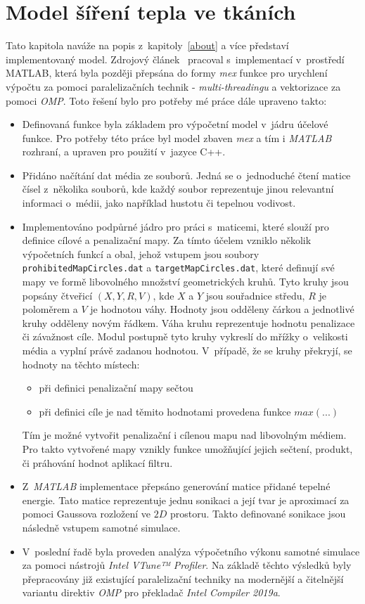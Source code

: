 \chapter{Model šíření tepla ve tkáních}
\label{chap:5}
Tato kapitola naváže na popis z~kapitoly~\ref{about} a více představí implementovaný model. Zdrojový článek~\cite{FITPUB11696} pracoval s~implementací v~prostředí MATLAB, která byla později přepsána do formy \emph{mex} funkce pro urychlení výpočtu za pomoci paralelizačních technik - \emph{multi-threadingu} a vektorizace za pomoci \emph{OMP}. Toto řešení bylo pro potřeby mé práce dále upraveno takto:
\begin{itemize}
    \item Definovaná funkce byla základem pro výpočetní model v~jádru účelové funkce. Pro potřeby této práce byl model zbaven \emph{mex} a tím i \emph{MATLAB} rozhraní, a upraven pro použití v~jazyce C++. 
    \item Přidáno načítání dat média ze souborů. Jedná se o~jednoduché čtení matice čísel z~několika souborů, kde každý soubor reprezentuje jinou relevantní informaci o~médii, jako například hustotu či tepelnou vodivost. 
    \item Implementováno podpůrné jádro pro práci s~maticemi, které slouží pro definice cílové a penalizační mapy. Za tímto účelem vzniklo několik výpočetních funkcí a obal, jehož vstupem jsou soubory \texttt{prohibitedMapCircles.dat} a \texttt{targetMapCircles.dat}, které definují své mapy ve formě libovolného množství geometrických kruhů. Tyto kruhy jsou popsány čtveřicí $(X,Y,R,V)$, kde $X$ a $Y$ jsou souřadnice středu, $R$ je poloměrem a $V$ je hodnotou váhy. Hodnoty jsou odděleny čárkou a jednotlivé kruhy odděleny novým řádkem. Váha kruhu reprezentuje hodnotu penalizace či závažnost cíle. Modul postupně tyto kruhy vykreslí do mřížky o~velikosti média a vyplní právě zadanou hodnotou. V~případě, že se kruhy překryjí, se hodnoty na těchto místech: \begin{itemize}
        \item při definici penalizační mapy sečtou
        \item při definici cíle je nad těmito hodnotami provedena funkce $max(...)$
    \end{itemize}
    Tím je možné vytvořit penalizační i cílenou mapu nad libovolným médiem.  
    Pro takto vytvořené mapy vznikly funkce umožňující jejich sečtení, produkt, či práhování hodnot aplikací filtru.
    \item Z~\emph{MATLAB} implementace přepsáno generování matice přidané tepelné energie. Tato matice reprezentuje jednu sonikaci a její tvar je aproximací za pomoci Gaussova rozložení ve $2D$ prostoru. Takto definované sonikace jsou následně vstupem samotné simulace.
    \item V~poslední řadě byla proveden analýza výpočetního výkonu samotné simulace za pomoci nástrojů \emph{Intel VTune™ Profiler}. Na základě těchto výsledků byly přepracovány již existující paralelizační techniky na modernější a čitelnější variantu direktiv \emph{OMP} pro překladač \emph{Intel Compiler 2019a}.
\end{itemize}


